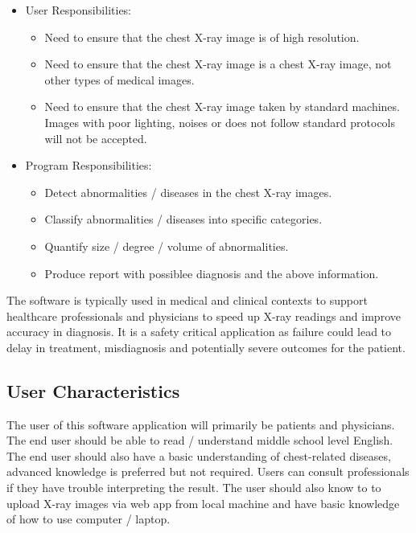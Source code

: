 \documentclass[12pt]{article}
\begin{document}
\begin{itemize}
\item User Responsibilities:
\begin{itemize}
\item {Need to ensure that the chest X-ray image is of high resolution. }
\item {Need to ensure that the chest X-ray image is a chest X-ray image, not other types of medical images.}
\item {Need to ensure that the chest X-ray image taken by standard machines. Images with poor lighting, noises or does not follow standard protocols will not be accepted. }
\end{itemize}
\item Program Responsibilities:
\begin{itemize}
\item {Detect abnormalities / diseases in the chest X-ray images.}
\item {Classify abnormalities / diseases into specific categories.}
\item {Quantify size / degree / volume of abnormalities.}
\item {Produce report with possiblee diagnosis and the above information.}
\end{itemize}
\end{itemize}

The software is typically used in medical and clinical contexts to support healthcare professionals and physicians to speed up X-ray readings and improve accuracy in diagnosis. It is a safety critical application as failure could lead to delay in treatment, misdiagnosis and potentially severe outcomes for the patient.


\subsection{User Characteristics} \label{SecUserCharacteristics}

The user of this software application will primarily be patients and physicians. The end user should be able to read / understand middle school level English. The end user should also have a basic understanding of chest-related diseases, advanced knowledge is preferred but not required. Users can consult professionals if they have trouble interpreting the result. The user should also know to to upload X-ray images via web app from local machine and have basic knowledge of how to use computer / laptop. \\
\end{document}
